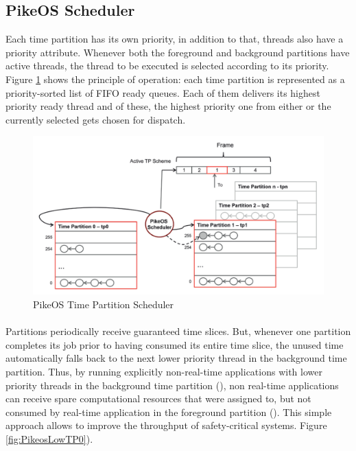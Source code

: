 \subsection{PikeOS Scheduler}\label{sec:P4Scheduler}
Each time partition has its own priority, in addition to that, threads also have a priority attribute. Whenever both the foreground and background partitions have active threads, the thread to be executed is selected according to its priority. Figure \ref{fig:PikeosScheduler} shows the principle of operation: each time partition is represented as a priority-sorted list of FIFO ready queues. Each of them delivers its highest priority ready thread and of these, the highest priority one from either  or the currently selected  gets chosen for dispatch.

\begin{figure}[htbp] 
\centering    
\includegraphics[width=1.0\textwidth]{PikeosScheduler}
\caption{PikeOS Time Partition Scheduler}
\label{fig:PikeosScheduler}
\end{figure}

\paragraph{} Partitions periodically receive guaranteed time slices. But, whenever one partition completes its job prior to having consumed its entire time slice, the unused time automatically falls back to the next lower priority thread in the background time partition. Thus, by running explicitly non-real-time applications with lower priority threads in the background time partition (),  non real-time applications can receive spare computational resources that were assigned to, but not consumed by real-time application in the foreground partition (). This simple approach allows to improve the throughput of safety-critical systems. Figure \ref{fig:PikeosLowTP0}).

